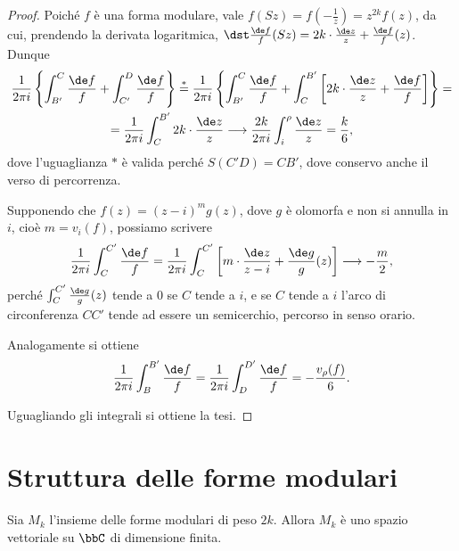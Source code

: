 \begin{proof}
	Poiché $f$ è una forma modulare, vale $f(Sz)=f(-\frac{1}{z})=z^{2k}f(z)$, da cui, prendendo la derivata logaritmica,
	$\dst\frac{\de f}{f}(Sz)=2k\cdot\frac{\de z}{z}+\frac{\de f}{f}(z)$. Dunque
	\begin{multline}
		\frac{1}{2\pi i}\left\{ \int_{B'}^C\frac{\de f}{f} + \int_{C'}^D\frac{\de f}{f} \right\} \overset{*}{=} %
		\frac{1}{2\pi i}\left\{ \int_{B'}^C\frac{\de f}{f} + \int_{C}^{B'} \left[2k \cdot \frac{\de z}{z} + \frac{\de f}{f}\right] \right\} = \\
		= \frac{1}{2\pi i}\int_{C}^{B'} 2k \cdot \frac{\de z}{z} \longrightarrow \frac{2k}{2\pi i}\int_i^\rho \frac{\de z}{z} = \frac{k}{6},
	\end{multline}
	dove l'uguaglianza $*$ è valida perché $S(C'D)=CB'$, dove conservo anche il verso di percorrenza.
	
	Supponendo che $f(z)=(z-i)^mg(z)$, dove $g$ è olomorfa e non si annulla in $i$, cioè $m=v_i(f)$, possiamo scrivere
	\begin{equation*}
		\frac{1}{2\pi i}\int_C^{C'}\frac{\de f}{f} = \frac{1}{2\pi i}\int_C^{C'}\left[ m\cdot\frac{\de z}{z-i} + %
		\frac{\de g}{g}(z) \right] \longrightarrow -\frac{m}{2},
	\end{equation*}
	perché $\int_C^{C'}\frac{\de g}{g}(z)$ tende a $0$ se $C$ tende a $i$, e se $C$ tende a $i$ l'arco di circonferenza $CC'$ tende ad essere un semicerchio, percorso in senso orario.
	
	Analogamente si ottiene 
	\begin{equation*}
		\frac{1}{2\pi i}\int_B^{B'}\frac{\de f}{f}=\frac{1}{2\pi i}\int_D^{D'}\frac{\de f}{f}=-\frac{v_\rho(f)}{6}.
	\end{equation*}
	
	Uguagliando gli integrali si ottiene la tesi.
\end{proof}

\section{Struttura delle forme modulari}

\begin{corollario}
	Sia $M_k$ l'insieme delle forme modulari di peso $2k$. Allora $M_k$ è uno spazio vettoriale su $\bbC$ di dimensione finita.
\end{corollario}


